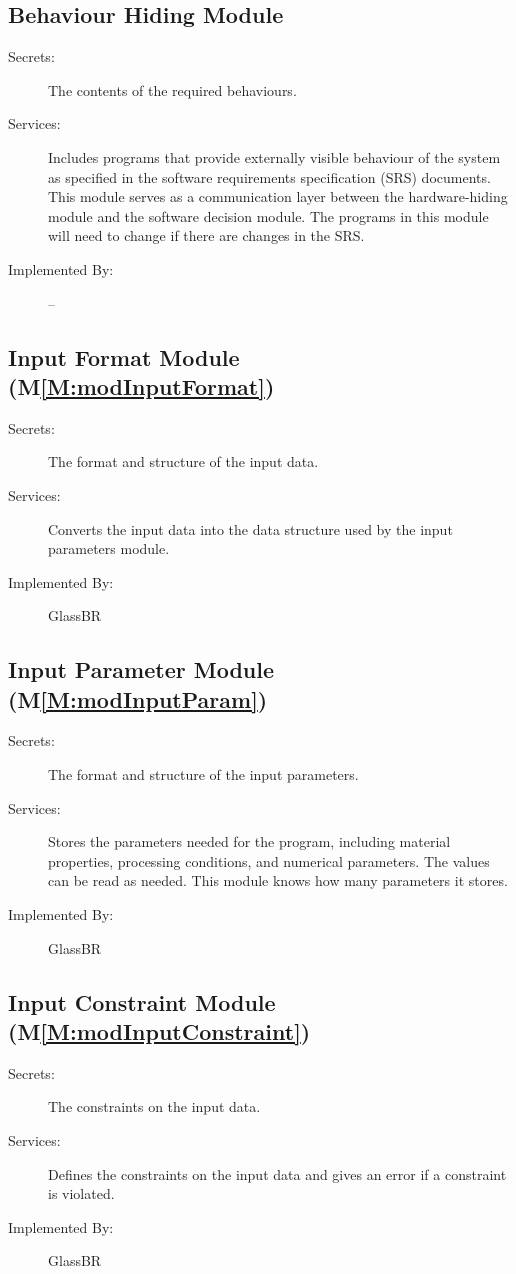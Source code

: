 \documentclass[12pt]{article}
\begin{document}
\subsection{Behaviour Hiding Module}
\label{Sec:BehaHidiModu}
\begin{description}
\item[Secrets:]The contents of the required behaviours.
\item[Services:]Includes programs that provide externally visible behaviour of the system as specified in the software requirements specification (SRS) documents. This module serves as a communication layer between the hardware-hiding module and the software decision module. The programs in this module will need to change if there are changes in the SRS.
\item[Implemented By:]--
\end{description}
\subsection{Input Format Module (M\ref{M:modInputFormat})}
\label{Sec:InpuFormModu()}
\begin{description}
\item[Secrets:]The format and structure of the input data.
\item[Services:]Converts the input data into the data structure used by the input parameters module.
\item[Implemented By:]GlassBR
\end{description}
\subsection{Input Parameter Module (M\ref{M:modInputParam})}
\label{Sec:InpuParaModu()}
\begin{description}
\item[Secrets:]The format and structure of the input parameters.
\item[Services:]Stores the parameters needed for the program, including material properties, processing conditions, and numerical parameters. The values can be read as needed. This module knows how many parameters it stores.
\item[Implemented By:]GlassBR
\end{description}
\subsection{Input Constraint Module (M\ref{M:modInputConstraint})}
\label{Sec:InpuConsModu()}
\begin{description}
\item[Secrets:]The constraints on the input data.
\item[Services:]Defines the constraints on the input data and gives an error if a constraint is violated.
\item[Implemented By:]GlassBR
\end{description}
\end{document}
